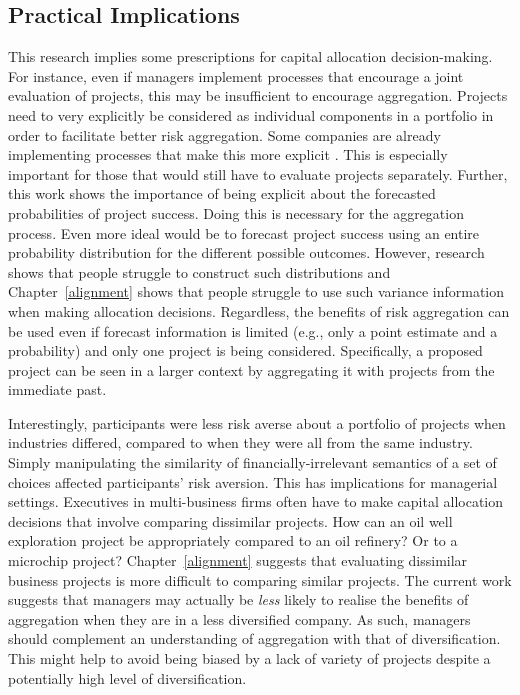 \documentclass[a4paper, nobind]{templates/ociamthesis}
\theoremstyle{definition}
\theoremstyle{definition}
\theoremstyle{definition}
\theoremstyle{definition}
\theoremstyle{remark}
\begin{document}
\subsection{Practical Implications}

This research implies some prescriptions for capital allocation decision-making.
For instance, even if managers implement processes that encourage a joint
evaluation of projects, this may be insufficient to encourage aggregation.
Projects need to very explicitly be considered as individual components in a
portfolio in order to facilitate better risk aggregation. Some companies are
already implementing processes that make this more explicit \autocite{lovallo2020}. This
is especially important for those that would still have to evaluate projects
separately. Further, this work shows the importance of being explicit about the
forecasted probabilities of project success. Doing this is necessary for the
aggregation process. Even more ideal would be to forecast project success using
an entire probability distribution for the different possible outcomes. However,
research shows that people struggle to construct such distributions \autocites[e.g.,][]{alpert1982,schaefer1973,staelvonholstein1971,tversky1974} and
Chapter~\ref{alignment} shows that people struggle to use such variance
information when making allocation decisions. Regardless, the benefits of risk
aggregation can be used even if forecast information is limited (e.g., only a
point estimate and a probability) and only one project is being considered.
Specifically, a proposed project can be seen in a larger context by aggregating
it with projects from the immediate past.

Interestingly, participants were less risk averse about a portfolio of projects
when industries differed, compared to when they were all from the same industry.
Simply manipulating the similarity of financially-irrelevant semantics of a set
of choices affected participants' risk aversion. This has implications for
managerial settings. Executives in multi-business firms often have to make
capital allocation decisions that involve comparing dissimilar projects. How can
an oil well exploration project be appropriately compared to an oil refinery? Or
to a microchip project? Chapter~\ref{alignment} suggests that evaluating
dissimilar business projects is more difficult to comparing similar projects.
The current work suggests that managers may actually be \emph{less} likely to realise
the benefits of aggregation when they are in a less diversified company. As
such, managers should complement an understanding of aggregation with that of
diversification. This might help to avoid being biased by a lack of variety of
projects despite a potentially high level of diversification.
\end{document}
